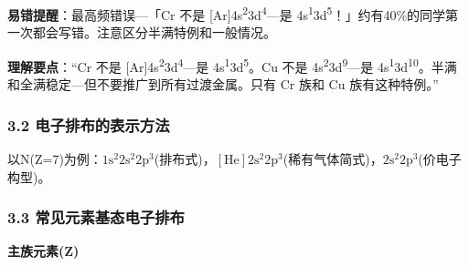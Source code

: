 \textbf{易错提醒}：最高频错误---「Cr 不是 {[}Ar{]}4s\textsuperscript{2}3d\textsuperscript{4}---是 4s\textsuperscript{1}3d\textsuperscript{5}！」约有40\%的同学第一次都会写错。注意区分半满特例和一般情况。

\textbf{理解要点}：``Cr 不是 {[}Ar{]}4s\textsuperscript{2}3d\textsuperscript{4}---是 4s\textsuperscript{1}3d\textsuperscript{5}。Cu 不是 4s\textsuperscript{2}3d\textsuperscript{9}---是 4s\textsuperscript{1}3d\textsuperscript{10}。半满和全满稳定---但不要推广到所有过渡金属。只有 Cr 族和 Cu 族有这种特例。''

\subsubsection{3.2 电子排布的表示方法}\label{ux7535ux5b50ux6392ux5e03ux7684ux8868ux793aux65b9ux6cd5}

以N(Z=7)为例：\(1\mathrm{s}^2 2\mathrm{s}^2 2\mathrm{p}^3\)(排布式)，\([\mathrm{He}] 2\mathrm{s}^2 2\mathrm{p}^3\)(稀有气体简式)，\(2\mathrm{s}^2 2\mathrm{p}^3\)(价电子构型)。

\subsubsection{3.3 常见元素基态电子排布}\label{ux5e38ux89c1ux5143ux7d20ux57faux6001ux7535ux5b50ux6392ux5e03}

\textbf{主族元素(Z)}

